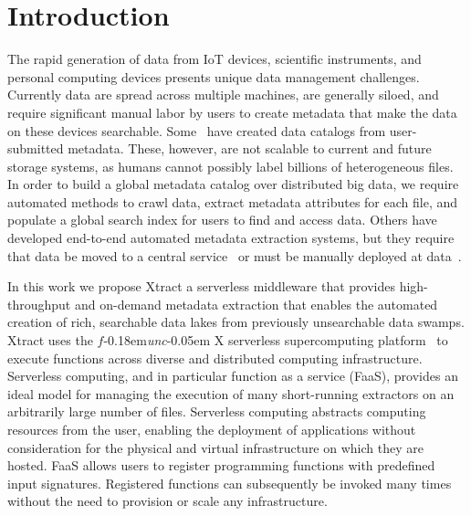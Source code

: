\documentclass[sigconf, 9pt]{acmart}
\newcommand{\tyler}[1]{}
\newcommand{\kyle}[1]{}
\newcommand{\tyler}[1]{{\textcolor{cyan}{ tyler: #1 }}}
\newcommand{\kyle}[1]{{\textcolor{purple}{ Kyle: #1 }}}
\newcommand{\name}{Xtract}
\newcommand{\funcx}{$f$\kern-0.18em\emph{unc}\kern-0.05em X}
\begin{document}


\maketitle


\section{Introduction}

The rapid generation of data from IoT devices, scientific instruments, and personal computing devices presents unique 
data management challenges. Currently data are spread across multiple machines, are generally siloed, and require 
significant manual labor by users to create metadata that make the data on these devices searchable. Some~\cite{egan2003vizier, welter2013nhgri, irods, dataverse}  have created data catalogs from user-submitted metadata. These, however, are not scalable to current and future storage systems,
as humans cannot possibly label billions of heterogeneous files. 
In order to build a global metadata catalog over distributed big data, we require automated methods to crawl data, extract 
metadata attributes for each file, and populate a global search index for users to find and access data. Others have developed end-to-end 
automated metadata extraction systems, but they require that data be moved to a central service~\cite{skluzacek2018skluma, skluzacek2016klimatic, padhy2015brown, rodrigo2018sciencesearch} or must be manually deployed at data~\cite{mattmann2011tika}.  \kyle{Explain in one sentence how we're different.}

\tyler{un-plagiarize the serverless sentences}
In this work we propose \name{}
a serverless middleware that provides high-throughput and on-demand metadata 
extraction that enables the automated creation of rich, searchable data lakes from previously unsearchable data swamps. 
\name{} uses the \funcx{} serverless supercomputing platform~\cite{chard2019serverless}
to execute functions across diverse and distributed computing infrastructure.
Serverless computing, and in particular function as a service (FaaS),
provides an ideal model for managing the execution of
many short-running extractors on an arbitrarily large number of files. 
Serverless computing abstracts computing resources from the user, enabling
the deployment of applications without consideration for the physical and virtual infrastructure on which 
they are hosted. FaaS allows users to register programming functions with predefined input signatures.
Registered functions can subsequently be invoked many times
without the need to provision or scale any infrastructure.
\end{document}
